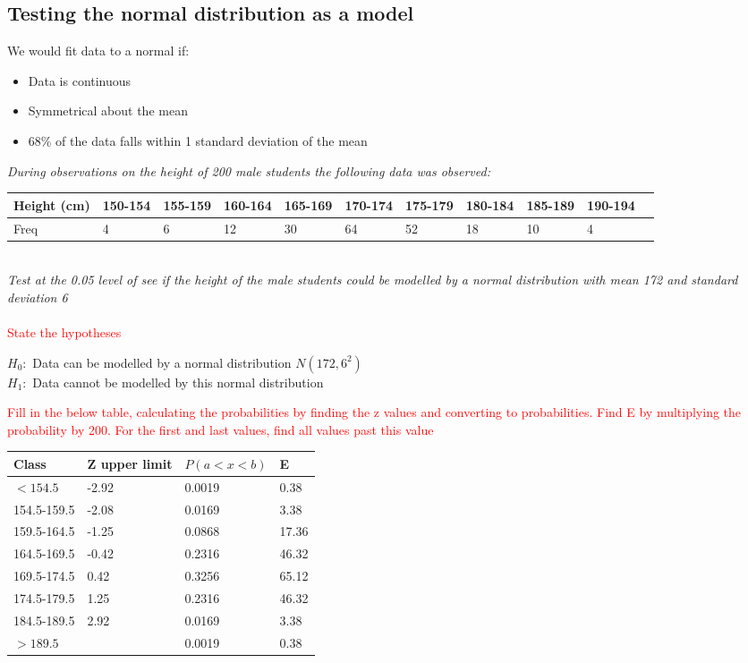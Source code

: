 \documentclass{article}[18pt]
\begin{document}
\subsection{Testing the normal distribution as a model}
We would fit data to a normal if:
\begin{itemize}
\item Data is continuous
\item Symmetrical about the mean
\item 68\% of the data falls within 1 standard deviation of the mean
\end{itemize}
\textit{During observations on the height of 200 male students the following data was observed:}\\
\begin{tabularx}{\textwidth}{|X|X|X|X|X|X|X|X|X|X|X|}
\hline
Height (cm)&150-154&155-159&160-164&165-169&170-174&175-179&180-184&185-189&190-194\\
\hline
Freq&4&6&12&30&64&52&18&10&4\\
\hline
\end{tabularx}
\\
\textit{Test at the 0.05 level of see if the height of the male students could be modelled by a normal distribution with mean 172 and standard deviation 6}\\
\\
\textcolor{red}{State the hypotheses}
\begin{center}
$H_0:$ Data can be modelled by a normal distribution $N(172,6^2)$\\
$H_1:$ Data cannot be modelled by this normal distribution
\end{center}
\textcolor{red}{Fill in the below table, calculating the probabilities by finding the z values and converting to probabilities. Find E by multiplying the probability by 200. For the first and last values, find all values past this value}\\
\begin{tabularx}{\textwidth}{|X|X|X|X|}
\hline
Class&Z upper limit&$P(a<x<b)$&E\\
\hline
$<154.5$&-2.92&0.0019&0.38\\
\hline
154.5-159.5&-2.08&0.0169&3.38\\
\hline
159.5-164.5&-1.25&0.0868&17.36\\
\hline
164.5-169.5&-0.42&0.2316&46.32\\
\hline
169.5-174.5&0.42&0.3256&65.12\\
\hline
174.5-179.5&1.25&0.2316&46.32\\
\hline
184.5-189.5&2.92&0.0169&3.38\\
\hline
$>189.5$&&0.0019&0.38\\
\hline
\end{tabularx}
\end{document}
